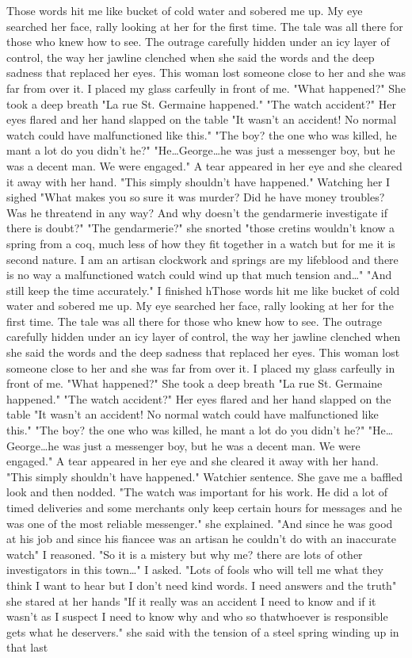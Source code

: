 \newscene

Those words hit me like bucket of cold water and sobered me up. My eye searched her face, rally looking at her for the first time. The tale was all there for those who knew how to see. The outrage carefully hidden under an icy layer of control, the way her jawline clenched when she said the words and the deep sadness that replaced her eyes. This woman lost someone close to her and she was far from over it. I placed my glass carfeully in front of me. "What happened?" She took a deep breath "La rue St. Germaine happened." "The watch accident?" Her eyes flared and her hand slapped on the table "It wasn't an accident! No normal watch could have malfunctioned like this." "The boy? the one who was killed, he mant a lot do you didn't he?" "He\dots George\dots he was just a messenger boy, but he was a decent man. We were engaged." A tear appeared in her eye and she cleared it away with her hand. "This simply shouldn't have happened." Watching her I sighed "What makes you so sure it was murder? Did he have money troubles? Was he threatend in any way? And why doesn't the gendarmerie investigate if there is doubt?" "The gendarmerie?" she snorted "those cretins wouldn't know a spring from a coq, much less of how they fit together in a watch but for me it is second nature. I am an artisan clockwork and springs are my lifeblood and there is no way a malfunctioned watch could wind up that much tension and\dots" "And still keep the time accurately." I finished hThose words hit me like bucket of cold water and sobered me up. My eye searched her face, rally looking at her for the first time. The tale was all there for those who knew how to see. The outrage carefully hidden under an icy layer of control, the way her jawline clenched when she said the words and the deep sadness that replaced her eyes. This woman lost someone close to her and she was far from over it. I placed my glass carfeully in front of me. "What happened?" She took a deep breath "La rue St. Germaine happened." "The watch accident?" Her eyes flared and her hand slapped on the table "It wasn't an accident! No normal watch could have malfunctioned like this." "The boy? the one who was killed, he mant a lot do you didn't he?" "He\dots George\dots he was just a messenger boy, but he was a decent man. We were engaged." A tear appeared in her eye and she cleared it away with her hand. "This simply shouldn't have happened." Watchier sentence. She gave me a baffled look and then nodded. "The watch was important for his work. He did a lot of timed deliveries and some merchants only keep certain hours for messages and he was one of the most reliable messenger." she explained. "And since he was good at his job and since his fiancee was an artisan he couldn't do with an inaccurate watch" I reasoned. "So it is a mistery but why me? there are lots of other investigators in this town\dots" I asked. "Lots of fools who will tell me what they think I want to hear but I don't need kind words. I need answers and the truth" she stared at her hands "If it really was an accident I need to know and if it wasn't as I suspect I need to know why and who so thatwhoever is responsible gets what he deservers." she said with the tension of a steel spring winding up in that last 
